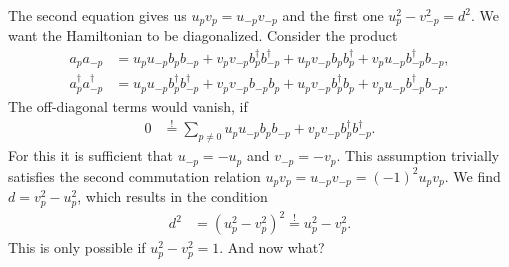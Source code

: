 \documentclass[english, parskip=full]{scrartcl}
\newcommand{\kom}{}
\begin{document}
The second equation gives us $u_pv_p=u_{-p}v_{-p}$ and the first one $u_p^2-v_{-p}^2=d^2$.
We want the Hamiltonian to be diagonalized.
Consider the product
\begin{align}
a_pa_{-p}&=u_pu_{-p}b_pb_{-p}+v_pv_{-p}b_p^\dagger b_{-p}^\dagger +u_pv_{-p}b_pb_p^\dagger + v_pu_{-p}b_{-p}^\dagger b_{-p},\\
a_p^\dagger a_{-p}^\dagger &=u_pu_{-p}b_p^\dagger b_{-p}^\dagger + v_pv_{-p}b_{-p}b_p+u_pv_{-p}b_p^\dagger b_p+v_pu_{-p}b_{-p}^\dagger b_{-p}.
\end{align}
The off-diagonal terms would vanish, if
\begin{align}
0&\overset{!}{=}\sum_{p\neq 0}u_pu_{-p}b_pb_{-p}+v_pv_{-p}b_p^\dagger b_{-p}^\dagger.
\end{align}
For this it is sufficient that $u_{-p}=-u_p$ and $v_{-p}=-v_p$.
This assumption trivially satisfies the second commutation relation $u_pv_p=u_{-p}v_{-p}=(-1)^2u_pv_p$.
We find $d=v_p^2-u_p^2$, which results in the condition
\begin{align}
d^2&=(u_p^2-v_p^2)^2\overset{!}{=}u_p^2-v_p^2.
\end{align}
This is only possible if $u_p^2-v_p^2=1$.
And now what?
\end{document}

